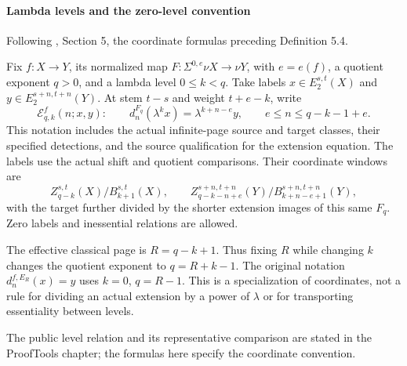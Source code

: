 \paragraph*{Lambda levels and the zero-level convention}
Following \cite{LWX126}, Section 5, the coordinate formulas preceding
Definition 5.4.\par
Fix $f:X\to Y$, its normalized map
$F:\Sigma^{0,e}\nu X\to\nu Y$, with $e=e(f)$, a quotient exponent
$q>0$, and a lambda level $0\leq k<q$. Take labels
$x\in E_2^{s,t}(X)$ and $y\in E_2^{s+n,t+n}(Y)$.
At stem $t-s$ and weight $t+e-k$, write
\[
\mathcal E^f_{q,k}(n;x,y):\qquad
d_n^{F_q}(\lambda^kx)=\lambda^{k+n-e}y,
\qquad e\leq n\leq q-k-1+e.
\]
This notation includes the actual infinite-page source and target classes,
their specified detections, and the source qualification for the extension
equation. The labels use the actual shift and quotient comparisons. Their
coordinate windows are
\[
Z_{q-k}^{s,t}(X)/B_{k+1}^{s,t}(X),\qquad
Z_{q-k-n+e}^{s+n,t+n}(Y)/B_{k+n-e+1}^{s+n,t+n}(Y),
\]
with the target further divided by the shorter extension images of this
same $F_q$. Zero labels and inessential relations are allowed.

The effective classical page is $R=q-k+1$. Thus fixing $R$ while
changing $k$ changes the quotient exponent to $q=R+k-1$. The original
notation $d_n^{f,E_R}(x)=y$ uses $k=0$, $q=R-1$. This is a
specialization of coordinates, not a rule for dividing an actual extension
by a power of $\lambda$ or for transporting essentiality between levels.

The public level relation and its representative comparison are stated in
the ProofTools chapter; the formulas here specify the coordinate convention.


